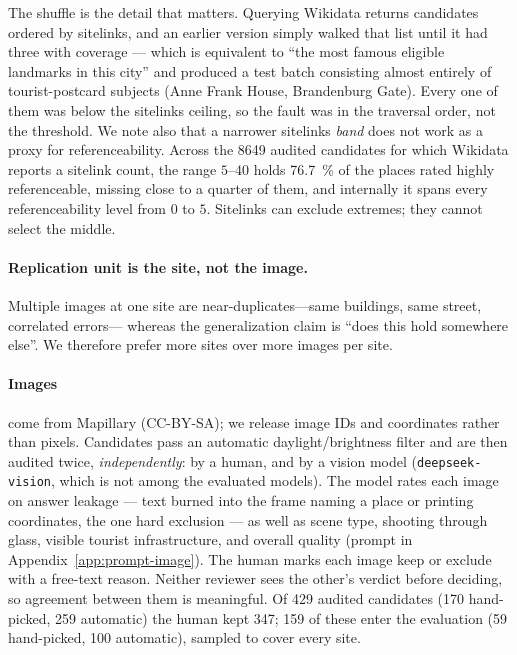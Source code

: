\documentclass[10pt,a4paper]{article}
\begin{document}
The shuffle is the detail that matters. Querying Wikidata returns candidates
ordered by sitelinks, and an earlier version simply walked that list until it
had three with coverage --- which is equivalent to ``the most famous eligible
landmarks in this city'' and produced a test batch consisting almost entirely of
tourist-postcard subjects (Anne Frank House, Brandenburg Gate). Every one of
them was below the sitelinks ceiling, so the fault was in the traversal order,
not the threshold. We note also that a narrower sitelinks \emph{band} does not
work as a proxy for referenceability. Across the \num{8649} audited candidates
for which Wikidata reports a sitelink count, the range $5$--$40$ holds
\SI{76.7}{\percent} of the places rated highly referenceable, missing close to a
quarter of them, and internally it spans every referenceability level from
$0$ to $5$. Sitelinks can exclude extremes; they cannot select the middle.

\paragraph{Replication unit is the site, not the image.} Multiple images at one
site are near-duplicates---same buildings, same street, correlated errors---
whereas the generalization claim is ``does this hold somewhere else''. We
therefore prefer more sites over more images per site.

\paragraph{Images} come from Mapillary (CC-BY-SA); we release image IDs and
coordinates rather than pixels. Candidates pass an automatic daylight/brightness
filter and are then audited twice, \emph{independently}: by a human, and by a
vision model (\texttt{deepseek-vision}, which is not among the evaluated
models). The model rates each image on answer leakage --- text burned into the
frame naming a place or printing coordinates, the one hard exclusion --- as well
as scene type, shooting through glass, visible tourist infrastructure, and
overall quality (prompt in Appendix~\ref{app:prompt-image}). The human marks each image keep or exclude with a free-text
reason. Neither reviewer sees the other's verdict before deciding, so agreement
between them is meaningful. Of \num{429} audited candidates (\num{170}
hand-picked, \num{259} automatic) the human kept \num{347}; \num{159} of these
enter the evaluation (\num{59} hand-picked, \num{100} automatic), sampled to
cover every site.
\end{document}
